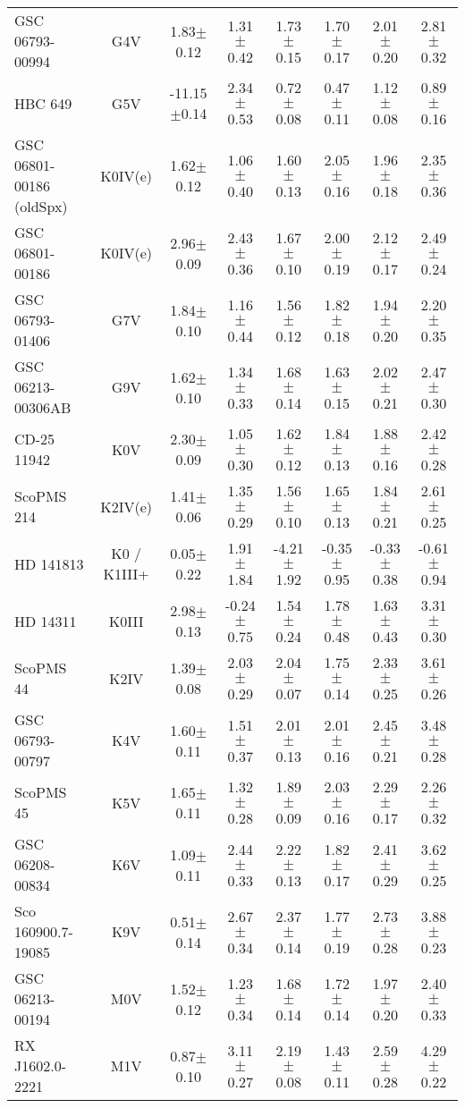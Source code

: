 \begin{table}
\begin{center}
\begin{tabular}{l|c|c|c|c|c|c|c}
GSC 06793-00994 & G4V & 1.83$\pm$0.12 & 1.31$\pm$0.42 & 1.73$\pm$0.15 & 1.70$\pm$0.17 & 2.01$\pm$0.20 & 2.81$\pm$0.32 \\
HBC 649 & G5V & -11.15$\pm$0.14 & 2.34$\pm$0.53 & 0.72$\pm$0.08 & 0.47$\pm$0.11 & 1.12$\pm$0.08 & 0.89$\pm$0.16 \\
GSC 06801-00186 (oldSpx) & K0IV(e) & 1.62$\pm$0.12 & 1.06$\pm$0.40 & 1.60$\pm$0.13 & 2.05$\pm$0.16 & 1.96$\pm$0.18 & 2.35$\pm$0.36 \\
GSC 06801-00186 & K0IV(e) & 2.96$\pm$0.09 & 2.43$\pm$0.36 & 1.67$\pm$0.10 & 2.00$\pm$0.19 & 2.12$\pm$0.17 & 2.49$\pm$0.24 \\
GSC 06793-01406 & G7V & 1.84$\pm$0.10 & 1.16$\pm$0.44 & 1.56$\pm$0.12 & 1.82$\pm$0.18 & 1.94$\pm$0.20 & 2.20$\pm$0.35 \\
GSC 06213-00306AB & G9V & 1.62$\pm$0.10 & 1.34$\pm$0.33 & 1.68$\pm$0.14 & 1.63$\pm$0.15 & 2.02$\pm$0.21 & 2.47$\pm$0.30 \\
CD-25 11942 & K0V & 2.30$\pm$0.09 & 1.05$\pm$0.30 & 1.62$\pm$0.12 & 1.84$\pm$0.13 & 1.88$\pm$0.16 & 2.42$\pm$0.28 \\
ScoPMS 214 & K2IV(e) & 1.41$\pm$0.06 & 1.35$\pm$0.29 & 1.56$\pm$0.10 & 1.65$\pm$0.13 & 1.84$\pm$0.21 & 2.61$\pm$0.25 \\
HD 141813 & K0 / K1III+ & 0.05$\pm$0.22 & 1.91$\pm$1.84 & -4.21$\pm$1.92 & -0.35$\pm$0.95 & -0.33$\pm$0.38 & -0.61$\pm$0.94 \\
HD 14311 & K0III & 2.98$\pm$0.13 & -0.24$\pm$0.75 & 1.54$\pm$0.24 & 1.78$\pm$0.48 & 1.63$\pm$0.43 & 3.31$\pm$0.30 \\
ScoPMS 44 & K2IV & 1.39$\pm$0.08 & 2.03$\pm$0.29 & 2.04$\pm$0.07 & 1.75$\pm$0.14 & 2.33$\pm$0.25 & 3.61$\pm$0.26 \\
GSC 06793-00797 & K4V & 1.60$\pm$0.11 & 1.51$\pm$0.37 & 2.01$\pm$0.13 & 2.01$\pm$0.16 & 2.45$\pm$0.21 & 3.48$\pm$0.28 \\
ScoPMS 45 & K5V & 1.65$\pm$0.11 & 1.32$\pm$0.28 & 1.89$\pm$0.09 & 2.03$\pm$0.16 & 2.29$\pm$0.17 & 2.26$\pm$0.32 \\
GSC 06208-00834 & K6V & 1.09$\pm$0.11 & 2.44$\pm$0.33 & 2.22$\pm$0.13 & 1.82$\pm$0.17 & 2.41$\pm$0.29 & 3.62$\pm$0.25 \\
Sco 160900.7-19085 & K9V & 0.51$\pm$0.14 & 2.67$\pm$0.34 & 2.37$\pm$0.14 & 1.77$\pm$0.19 & 2.73$\pm$0.28 & 3.88$\pm$0.23 \\
GSC 06213-00194 & M0V & 1.52$\pm$0.12 & 1.23$\pm$0.34 & 1.68$\pm$0.14 & 1.72$\pm$0.14 & 1.97$\pm$0.20 & 2.40$\pm$0.33 \\
RX J1602.0-2221 & M1V & 0.87$\pm$0.10 & 3.11$\pm$0.27 & 2.19$\pm$0.08 & 1.43$\pm$0.11 & 2.59$\pm$0.28 & 4.29$\pm$0.22 \\

\end{tabular}
\end{center}
\end{table}

